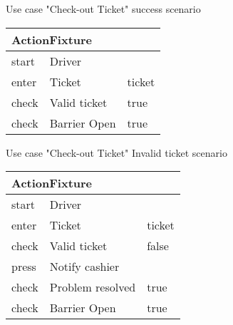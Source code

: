 
\noindent Use case "Check-out Ticket" success scenario
\madeby{\jb}{\af}

\vspace{0.4cm}
\begin{tabular}{| p{2cm} | p{5.5cm} | p{5.5cm} |} \hline
\multicolumn{3}{|l|}{ActionFixture} \\ \hline
start & \multicolumn{2}{|l|}{Driver} \\ \hline
enter & Ticket & ticket \\ \hline
check & Valid ticket & true \\ \hline
check & Barrier Open & true \\ \hline
\end{tabular}
\vspace{0.8cm}


\noindent Use case "Check-out Ticket" Invalid ticket scenario
\madeby{\jb}{\af}

\vspace{0.4cm}
\begin{tabular}{| p{2cm} | p{5.5cm} | p{5.5cm} |} \hline
\multicolumn{3}{|l|}{ActionFixture} \\ \hline
start & \multicolumn{2}{|l|}{Driver} \\ \hline
enter & Ticket & ticket \\ \hline
check & Valid ticket & false \\ \hline
press & \multicolumn{2}{|l|}{Notify cashier} \\ \hline
check & Problem resolved & true \\ \hline
check & Barrier Open & true \\ \hline
\end{tabular}
\vspace{0.8cm}
